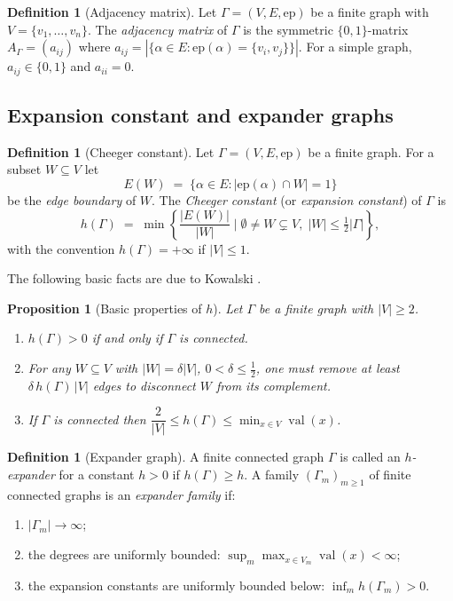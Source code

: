 \documentclass[12pt,a4paper]{amsart}
\newtheorem{proposition}[theorem]{Proposition}
\theoremstyle{definition}
\newtheorem{definition}[theorem]{Definition}
\DeclareMathOperator{\val}{val}
\newcommand{\hh}{h}          %
\begin{document}
\begin{definition}[Adjacency matrix]\label{def:adj}
Let $\varGamma=(V,E,\mathrm{ep})$ be a finite graph with
$V=\{v_1,\ldots,v_n\}$.  The \emph{adjacency matrix} of $\varGamma$ is
the symmetric $\{0,1\}$-matrix $A_\varGamma=(a_{ij})$ where
$a_{ij}=|\{\alpha\in E : \mathrm{ep}(\alpha)=\{v_i,v_j\}\}|$.  For a
simple graph, $a_{ij}\in\{0,1\}$ and $a_{ii}=0$.
\end{definition}

\subsection{Expansion constant and expander graphs}

\begin{definition}[Cheeger constant]\label{def:cheeger}
Let $\varGamma=(V,E,\mathrm{ep})$ be a finite graph.  For a subset
$W\subseteq V$ let
\[
  E(W) \;=\; \{\alpha\in E : |\mathrm{ep}(\alpha)\cap W|=1\}
\]
be the \emph{edge boundary} of $W$.  The \emph{Cheeger constant} (or
\emph{expansion constant}) of $\varGamma$ is
\[
  \hh(\varGamma)
  \;=\;
  \min\!\left\{
    \frac{|E(W)|}{|W|} \;\Big|\;
    \emptyset \neq W \subsetneq V,\; |W|\le\tfrac{1}{2}|\varGamma|
  \right\},
\]
with the convention $\hh(\varGamma)=+\infty$ if $|V|\le 1$.
\end{definition}

The following basic facts are due to Kowalski
\cite[Proposition~3.1.2 and Lemma~3.1.4]{Kowalski2019}.

\begin{proposition}[Basic properties of $\hh$]\label{prop:cheeger-basic}
Let $\varGamma$ be a finite graph with $|V|\ge 2$.
\begin{enumerate}[label=\normalfont(\roman*)]
  \item $\hh(\varGamma)>0$ if and only if $\varGamma$ is connected.
  \item For any $W\subseteq V$ with $|W|=\delta|V|$, $0<\delta\le\frac12$,
        one must remove at least $\delta\,\hh(\varGamma)\,|V|$ edges to
        disconnect $W$ from its complement.
  \item If $\varGamma$ is connected then
        $\dfrac{2}{|V|}\le\hh(\varGamma)\le\min_{x\in V}\val(x)$.
\end{enumerate}
\end{proposition}

\begin{definition}[Expander graph]\label{def:expander}
A finite connected graph $\varGamma$ is called an
\emph{$h$-expander} for a constant $h>0$ if
$\hh(\varGamma)\ge h$.
A family $(\varGamma_m)_{m\ge 1}$ of finite connected graphs is an
\emph{expander family} if:
\begin{enumerate}[label=\normalfont(\roman*)]
  \item $|\varGamma_m|\to\infty$;
  \item the degrees are uniformly bounded: $\sup_{m}\max_{x\in V_m}\val(x)<\infty$;
  \item the expansion constants are uniformly bounded below:
        $\inf_m \hh(\varGamma_m)>0$.
\end{enumerate}
\end{definition}
\end{document}
